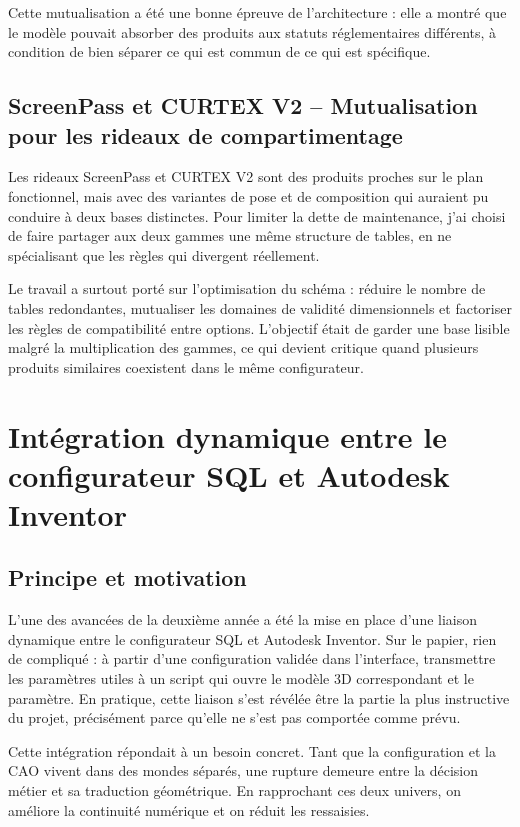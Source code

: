 Cette mutualisation a été une bonne épreuve de l'architecture : elle a montré que le modèle pouvait absorber des produits aux statuts réglementaires différents, à condition de bien séparer ce qui est commun de ce qui est spécifique.

\subsection{ScreenPass et CURTEX V2 -- Mutualisation pour les rideaux de compartimentage}

Les rideaux ScreenPass et CURTEX V2 sont des produits proches sur le plan fonctionnel, mais avec des variantes de pose et de composition qui auraient pu conduire à deux bases distinctes. Pour limiter la dette de maintenance, j'ai choisi de faire partager aux deux gammes une même structure de tables, en ne spécialisant que les règles qui divergent réellement.

Le travail a surtout porté sur l'optimisation du schéma : réduire le nombre de tables redondantes, mutualiser les domaines de validité dimensionnels et factoriser les règles de compatibilité entre options. L'objectif était de garder une base lisible malgré la multiplication des gammes, ce qui devient critique quand plusieurs produits similaires coexistent dans le même configurateur.

\section{Intégration dynamique entre le configurateur SQL et Autodesk Inventor}

\subsection{Principe et motivation}

L'une des avancées de la deuxième année a été la mise en place d'une liaison dynamique entre le configurateur SQL et Autodesk Inventor. Sur le papier, rien de compliqué : à partir d'une configuration validée dans l'interface, transmettre les paramètres utiles à un script qui ouvre le modèle 3D correspondant et le paramètre. En pratique, cette liaison s'est révélée être la partie la plus instructive du projet, précisément parce qu'elle ne s'est pas comportée comme prévu.

Cette intégration répondait à un besoin concret. Tant que la configuration et la CAO vivent dans des mondes séparés, une rupture demeure entre la décision métier et sa traduction géométrique. En rapprochant ces deux univers, on améliore la continuité numérique et on réduit les ressaisies.

